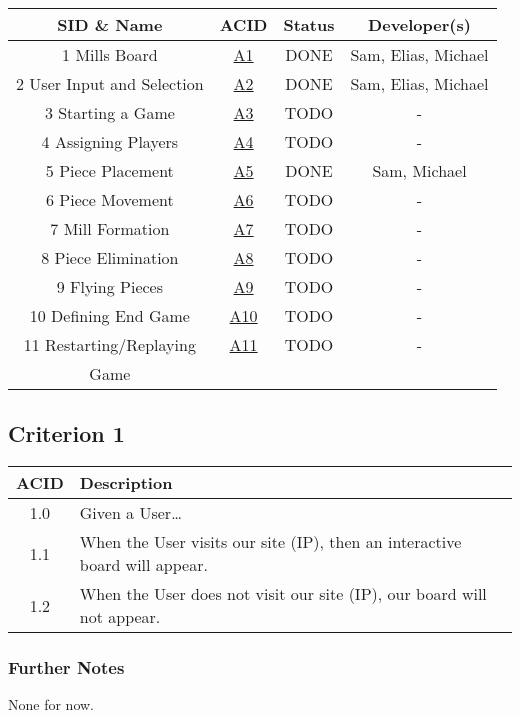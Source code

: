 \documentclass[11pt]{article}
\begin{document}
\begin{center}
\begin{tabular}{|c|c|c|c|}
SID \& Name & ACID & Status & Developer(s)\\
\hline
1 Mills Board & \hyperref[sec:orge987b3b]{A1} & DONE & Sam, Elias, Michael\\
\hline
2 User Input and Selection & \hyperref[sec:org6537254]{A2} & DONE & Sam, Elias, Michael\\
\hline
3 Starting a Game & \hyperref[sec:org1ef7475]{A3} & TODO & -\\
\hline
4 Assigning Players & \hyperref[sec:orgd18733b]{A4} & TODO & -\\
\hline
5 Piece Placement & \hyperref[sec:org50f1674]{A5} & DONE & Sam, Michael\\
\hline
6 Piece Movement & \hyperref[sec:org7d9fafd]{A6} & TODO & -\\
\hline
7 Mill Formation & \hyperref[sec:org2392c9b]{A7} & TODO & -\\
\hline
8 Piece Elimination & \hyperref[sec:org8f708c3]{A8} & TODO & -\\
\hline
9 Flying Pieces & \hyperref[sec:orgce0dbe4]{A9} & TODO & -\\
\hline
10 Defining End Game & \hyperref[sec:org5c8cfcc]{A10} & TODO & -\\
\hline
11 Restarting/Replaying & \hyperref[sec:org63f696e]{A11} & TODO & -\\
Game &  &  & \\
\end{tabular}
\end{center}

\subsection{Criterion 1}
\label{sec:orge987b3b}
\begin{center}
\begin{tabular}{|c|l|}
ACID & Description\\
\hline
1.0 & Given a User\ldots{}\\
\hline
1.1 & When the User visits our site (IP), then an interactive board will appear.\\
1.2 & When the User does not visit our site (IP), our board will not appear.\\
\end{tabular}
\end{center}

\subsubsection*{Further Notes}
\label{sec:org210d075}
None for now.
\end{document}
